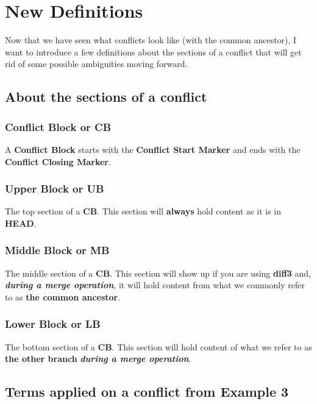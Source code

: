 
\section{New Definitions}

Now that we have seen what conflicts look like (with the common ancestor), I want to introduce a few definitions about
the sections of a conflict that will get rid of some possible ambiguities moving forward.

\subsection{About the sections of a conflict}

\subsubsection{Conflict Block or CB}
A {\bf Conflict Block} starts with the {\bf Conflict Start Marker} and ends with the {\bf Conflict Closing Marker}.

\subsubsection{Upper Block or UB}
The top section of a {\bf CB}. This section will {\bf always} hold content as it is in {\bf HEAD}.

\subsubsection{Middle Block or MB}
The middle section of a {\bf CB}. This section will show up if you are using {\bf diff3} and,
{\bf\it during a merge operation}, it will hold content from what we commonly refer to as {\bf the common ancestor}.

\subsubsection{Lower Block or LB}
The bottom section of a {\bf CB}. This section will hold content of what we refer to as {\bf the other branch}
{\bf\it during a merge operation}.

\subsection{Terms applied on a conflict from Example 3}

